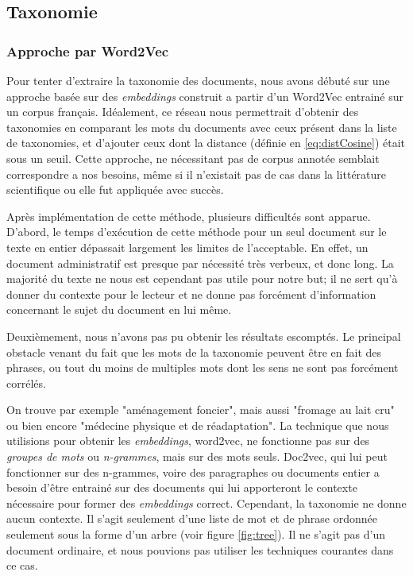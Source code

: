 
\subsection{Taxonomie}%
\subsubsection{Approche par Word2Vec}
Pour tenter d'extraire la taxonomie des documents, nous avons débuté sur une approche basée sur des \textit{embeddings} construit a partir d'un Word2Vec entrainé sur un corpus français. Idéalement, ce réseau nous permettrait d'obtenir des taxonomies en comparant les mots du documents avec ceux présent dans la liste de taxonomies, et d'ajouter ceux dont la distance (définie en \ref{eq:distCosine}) était sous un seuil. Cette approche, ne nécessitant pas de corpus annotée semblait correspondre a nos besoins, même si il n'existait pas de cas dans la littérature scientifique ou elle fut appliquée avec succès. %


Après implémentation de cette méthode, plusieurs difficultés sont apparue.
D'abord, le temps d'exécution de cette méthode pour un seul document sur le texte en entier dépassait largement les limites de l'acceptable.
En effet, un document administratif est presque par nécessité très verbeux, et donc long. La majorité du texte ne nous est cependant pas utile pour notre but; 
il ne sert qu'à donner du contexte pour le lecteur et ne donne pas forcément d'information concernant le sujet du document en lui même. 

Deuxièmement, nous n'avons pas pu obtenir les résultats escomptés. Le principal obstacle venant du fait que les mots de la taxonomie peuvent être en fait des phrases, ou tout du moins de multiples mots dont les sens ne sont pas forcément corrélés.

On trouve par exemple "aménagement foncier", mais aussi "fromage au lait cru" ou bien encore "médecine physique et de réadaptation".
La technique que nous utilisions pour obtenir les \textit{embeddings}, word2vec, ne fonctionne pas sur des \textit{groupes de mots} ou \textit{n-grammes}, mais sur des mots seuls. Doc2vec, qui lui peut fonctionner sur des n-grammes, voire des paragraphes ou documents entier a besoin d'être entrainé sur des documents qui lui apporteront le contexte nécessaire pour former des \textit{embeddings} correct.
Cependant, la taxonomie ne donne aucun contexte. Il s'agit seulement d'une liste de mot et de phrase ordonnée seulement sous la forme d'un arbre (voir figure \ref{fig:tree}). Il ne s'agit pas d'un document ordinaire, et nous pouvions pas utiliser les techniques courantes dans ce cas. 

